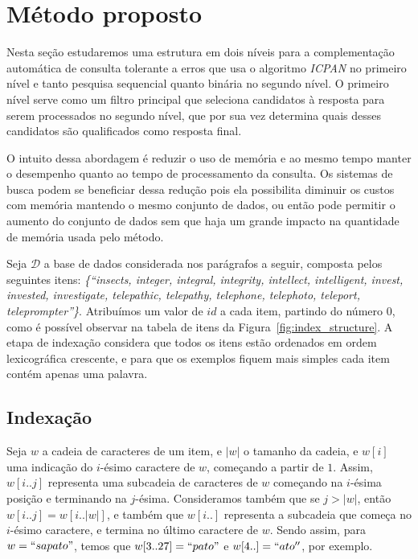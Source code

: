\chapter{Método proposto} \label{sec:metodo}

Nesta seção estudaremos uma estrutura em dois níveis para a complementação automática de consulta tolerante a erros que usa o algoritmo \textit{ICPAN} no primeiro nível e tanto pesquisa sequencial quanto binária no segundo nível. O primeiro nível serve como um filtro principal que seleciona candidatos à resposta para serem processados no segundo nível, que por sua vez determina quais desses candidatos são qualificados como resposta final.

O intuito dessa abordagem é reduzir o uso de memória e ao mesmo tempo manter o desempenho quanto ao tempo de processamento da consulta. Os sistemas de busca podem se beneficiar dessa redução pois ela possibilita diminuir os custos com memória mantendo o mesmo conjunto de dados, ou então pode permitir o aumento do conjunto de dados sem que haja um grande impacto na quantidade de memória usada pelo método.

Seja $\mathcal{D}$ a base de dados considerada nos parágrafos a seguir, composta pelos seguintes itens: \textit{\{``insects, integer, integral, integrity, intellect, intelligent, invest, invested, investigate, telepathic, telepathy, telephone, telephoto, teleport, teleprompter''\}}. Atribuímos um valor de $id$ a cada item, partindo do número $0$, como é possível observar na tabela de itens da Figura~\ref{fig:index_structure}. A etapa de indexação considera que todos os itens estão ordenados em ordem lexicográfica crescente, e para que os exemplos fiquem mais simples cada item contém apenas uma palavra.
 
\section{Indexação} 
\label{sec:indexing}
Seja $w$ a cadeia de caracteres de um item, e $|w|$ o tamanho da cadeia, e $w[i]$ uma indicação do $i$-ésimo caractere de $w$, começando a partir de $1$. Assim, $w[i..j]$ representa uma subcadeia de caracteres de $w$ começando na $i$-ésima posição e terminando na $j$-ésima. Consideramos também que se $j > |w|$, então $w[i..j] = w[i..|w|]$, e também que $w[i..]$ representa a subcadeia que começa no $i$-ésimo caractere, e termina no último caractere de $w$. Sendo assim, para $w = ``sapato"$, temos que $w[3..27] =  ``pato"$ e $w[4..] = ``ato''$, por exemplo.  


